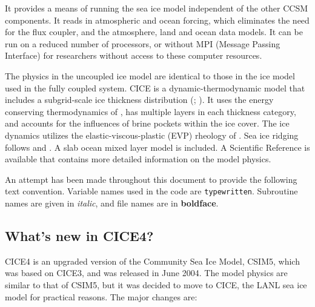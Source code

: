 It provides a means of running the sea ice model independent of the other CCSM 
components.  It reads in atmospheric and ocean forcing, which eliminates the 
need for the flux coupler, and the atmosphere, land and ocean data models.  It 
can be run on a reduced number of processors, or without MPI (Message Passing 
Interface) for researchers without access to these computer resources.

The physics in the uncoupled ice model are identical to those in the
ice model used in the fully coupled system.  CICE is a dynamic-thermodynamic
model that includes a subgrid-scale ice thickness distribution (\cite{bitz01};
\cite{lips01}).  It uses the energy conserving thermodynamics 
of \cite{bitz99}, has multiple layers in each thickness category, and accounts
for the influences of brine pockets within the ice cover.  The ice dynamics
utilizes the elastic-viscous-plastic (EVP) rheology of \cite{hunk97}.  Sea ice
ridging follows \cite{roth75b} and \cite{thor75}.  A slab ocean mixed layer model
is included.  A Scientific Reference is available that contains more detailed
information on the model physics. 

An attempt has been made throughout this document to provide the following
text convention.  Variable names used in the code are {\tt typewritten}.
Subroutine names are given in {\it italic}, and file names are in {\bf boldface}.

\subsection{What's new in CICE4?}

CICE4 is an upgraded version of the Community Sea Ice Model, CSIM5, which was
 based on CICE3, and was released in June 2004.  The model physics are similar to that of CSIM5, but it was decided to move to CICE, the LANL sea ice model for practical reasons.  The major changes are:

